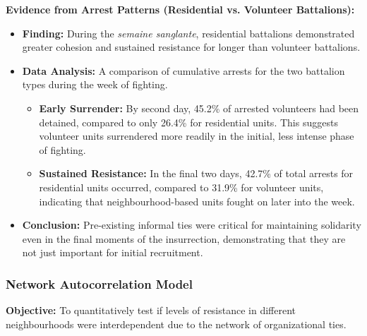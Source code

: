 \documentclass{article}
\begin{document}
    \noindent
\textbf{Evidence from Arrest Patterns (Residential vs. Volunteer Battalions):}
    \begin{itemize}
        \item \textbf{Finding:} During the \textit{semaine sanglante},
        residential battalions demonstrated greater cohesion and sustained
        resistance for longer than volunteer battalions.
        \item \textbf{Data Analysis:} A comparison of cumulative arrests for
        the two battalion types during the week of fighting.
        \begin{itemize}
            \item \textbf{Early Surrender:} By second day, 45.2\% of
            arrested volunteers had been detained, compared to only 26.4\%
            for residential units. This suggests volunteer units surrendered
            more readily in the initial, less intense phase of fighting.
            \item \textbf{Sustained Resistance:} In the final two days, 42.7\% of total arrests for residential units occurred, compared to 31.9\% for volunteer units, indicating that neighbourhood-based units fought on later into the week.
        \end{itemize}
        \item \textbf{Conclusion:} Pre-existing informal ties were critical
        for maintaining solidarity even in the final moments of the
        insurrection, demonstrating that they are not just important for
        initial recruitment.
    \end{itemize}

    \subsubsection{Network Autocorrelation Model}

    \noindent \textbf{Objective:} To quantitatively test if levels of
resistance in different neighbourhoods were interdependent due to the
network of organizational ties.\\
\end{document}
